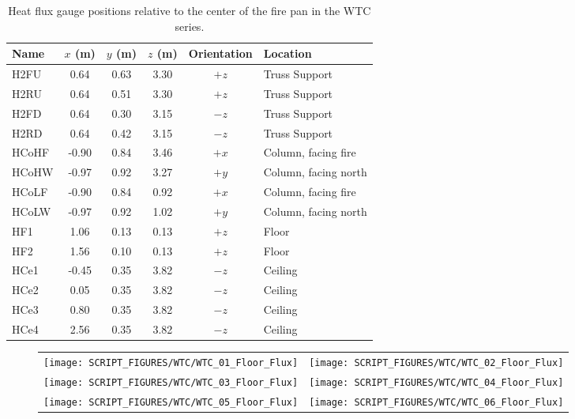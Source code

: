 \begin{table}[h!]
\caption{Heat flux gauge positions relative to the center of the fire pan in the WTC series.}
\begin{center}
\begin{tabular}{|l|c|c|c|c|l|}
\hline
Name    & $x$ (m)   & $y$ (m) & $z$ (m)   & Orientation  & Location  \\ \hline \hline
H2FU    & 0.64      & 0.63    & 3.30      &     $+z$     & Truss Support         \\ \hline
H2RU    & 0.64      & 0.51    & 3.30      &     $+z$     & Truss Support          \\ \hline
H2FD    & 0.64      & 0.30    & 3.15      &     $-z$     & Truss Support          \\ \hline
H2RD    & 0.64      & 0.42    & 3.15      &     $-z$     & Truss Support          \\ \hline
HCoHF   & -0.90     & 0.84    & 3.46      &     $+x$     & Column, facing fire          \\ \hline
HCoHW   & -0.97     & 0.92    & 3.27      &     $+y$     & Column, facing north          \\ \hline
HCoLF   & -0.90     & 0.84    & 0.92      &     $+x$     & Column, facing fire          \\ \hline
HCoLW   & -0.97     & 0.92    & 1.02      &     $+y$     & Column, facing north          \\ \hline
HF1     & 1.06      & 0.13    & 0.13      &     $+z$     & Floor          \\ \hline
HF2     & 1.56      & 0.10    & 0.13      &     $+z$     & Floor          \\ \hline
HCe1    & -0.45     & 0.35    & 3.82      &     $-z$     & Ceiling          \\ \hline
HCe2    &  0.05     & 0.35    & 3.82      &     $-z$     & Ceiling          \\ \hline
HCe3    &  0.80     & 0.35    & 3.82      &     $-z$     & Ceiling          \\ \hline
HCe4    &  2.56     & 0.35    & 3.82      &     $-z$     & Ceiling          \\ \hline
\end{tabular}
\end{center}
\label{WTC_Gauges}
\end{table}

\newpage

\begin{figure}[p]
\begin{tabular*}{\textwidth}{l@{\extracolsep{\fill}}r}
\texttt{[image: SCRIPT\_FIGURES/WTC/WTC\_01\_Floor\_Flux]} &
\texttt{[image: SCRIPT\_FIGURES/WTC/WTC\_02\_Floor\_Flux]} \\
\texttt{[image: SCRIPT\_FIGURES/WTC/WTC\_03\_Floor\_Flux]} &
\texttt{[image: SCRIPT\_FIGURES/WTC/WTC\_04\_Floor\_Flux]} \\
\texttt{[image: SCRIPT\_FIGURES/WTC/WTC\_05\_Floor\_Flux]} &
\texttt{[image: SCRIPT\_FIGURES/WTC/WTC\_06\_Floor\_Flux]}
\end{tabular*}
\label{NIST_WTC_Floor_Flux}
\end{figure}

